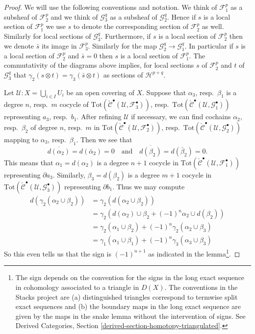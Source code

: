 \begin{proof}
We will use the following conventions and notation. We think of
${\mathcal F}_1^p$ as a subsheaf of ${\mathcal F}_2^p$ and we think of
${\mathcal G}_3^q$ as a subsheaf of ${\mathcal G}_2^q$. Hence if $s$ is
a local section of ${\mathcal F}_1^p$ we use $s$ to denote
the corresponding section of ${\mathcal F}_2^p$ as well. Similarly
for local sections of ${\mathcal G}_3^q$. Furthermore,
if $s$ is a local section of ${\mathcal F}_2^p$ then we denote
$\bar s$ its image in ${\mathcal F}_3^p$. Similarly for the
map ${\mathcal G}_2^q \to {\mathcal G}^q_1$. In particular if
$s$ is a local section of ${\mathcal F}_2^p$ and $\bar s = 0$
then $s$ is a local section of ${\mathcal F}_1^p$. The commutativity
of the diagrams above implies, for local sections $s$ of
${\mathcal F}_2^p$ and $t$ of ${\mathcal G}_3^q$ that
$\gamma_2(s \otimes t) = \gamma_3(\bar s \otimes t)$ as sections of
${\mathcal H}^{p + q}$.

\medskip\noindent
Let ${\mathcal U} : X =  \bigcup_{i \in I} U_i$
be an open covering of $X$. Suppose that $\alpha_3$,
resp.\ $\beta_1$ is a degree $n$, resp.\ $m$ cocycle of
$\text{Tot}(
\check{\mathcal{C}}^\bullet({\mathcal U}, {\mathcal F}_3^\bullet))$,
resp.\ $\text{Tot}(
\check{\mathcal{C}}^\bullet({\mathcal U}, {\mathcal G}_1^\bullet))$
representing $a_3$, resp.\ $b_1$. After refining $\mathcal{U}$ if necessary,
we can find cochains $\alpha_2$, resp.\ $\beta_2$ of
degree $n$, resp.\ $m$ in
$\text{Tot}(
\check{\mathcal{C}}^\bullet({\mathcal U}, {\mathcal F}_2^\bullet))$,
resp.\ $\text{Tot}(
\check{\mathcal{C}}^\bullet({\mathcal U}, {\mathcal G}_2^\bullet))$
mapping to $\alpha_3$, resp.\ $\beta_1$.
Then we see that
$$
\overline{d(\alpha_2)} = d(\bar \alpha_2) = 0
\quad\text{and}\quad
\overline{d(\beta_2)} = d(\bar \beta_2) = 0.
$$
This means that $\alpha_1 = d(\alpha_2)$ is a degree $n + 1$ cocycle in
$\text{Tot}(\check{\mathcal{C}}^\bullet({\mathcal U}, {\mathcal F}_1^\bullet))$
representing $\partial a_3$. Similarly, $\beta_3 = d(\beta_2)$ is
a degree $m + 1$ cocycle in
$\text{Tot}(\check{\mathcal{C}}^\bullet({\mathcal U}, {\mathcal G}_3^\bullet))$
representing $\partial b_1$.
Thus we may compute
\begin{align*}
d(\gamma_2(\alpha_2 \cup \beta_2))
& =
\gamma_2(d(\alpha_2 \cup \beta_2))
\\
& =
\gamma_2(d(\alpha_2) \cup \beta_2 + (-1)^n \alpha_2 \cup d(\beta_2) )
\\
& =
\gamma_2( \alpha_1 \cup \beta_2)  + (-1)^n \gamma_2( \alpha_2 \cup \beta_3)
\\
& =
\gamma_1(\alpha_1 \cup \beta_1) + (-1)^n \gamma_3(\alpha_3 \cup \beta_3)
\end{align*}
So this even tells us that the sign is $(-1)^{n + 1}$ as indicated
in the lemma\footnote{The sign depends on the convention for the
signs in the long exact sequence in cohomology associated to a triangle
in $D(X)$. The conventions in the Stacks project are (a) distinguished
triangles correspond to termwise split exact sequences and (b) the boundary
maps in the long exact sequence are given by the maps in the snake lemma
without the intervention of signs. See
Derived Categories, Section \ref{derived-section-homotopy-triangulated}.}.
\end{proof}

